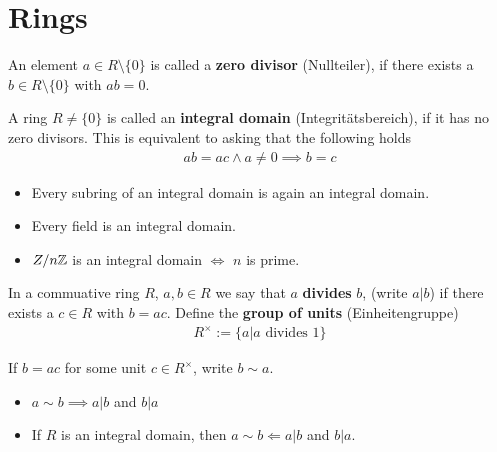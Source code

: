 \section{Rings}





\begin{dfn}
  An element $a \in R \setminus \{0\}$ is called a \textbf{zero divisor} (Nullteiler), if there exists a $b \in R \setminus \{0\}$ with $a b = 0$.

  A ring $R \neq \{0\}$ is called an \textbf{integral domain} (Integritätsbereich), if it has no zero divisors.
  This is equivalent to asking that the following holds
  \begin{align*}
    ab = ac \land a \neq 0 \implies b = c
  \end{align*}
\end{dfn}

\begin{prop}[]
  \phantom{a}
  \begin{itemize}
    \item Every subring of an integral domain is again an integral domain.
    \item Every field is an integral domain.
    \item $Z/n\mathbb{Z}$ is an integral domain $\iff$ $n$ is prime.
  \end{itemize}
\end{prop}

\begin{dfn}
  In a commuative ring $R$, $a,b \in R$ we say that $a$ \textbf{divides} $b$, (write $a | b$) if there exists a $c \in R$ with $b = ac$.
  Define the \textbf{group of units} (Einheitengruppe)
  \begin{align*}
    R^{\times} := \{a \big\vert a \text{ divides } 1\}
  \end{align*}

  If $b = ac$ for some unit $c \in R^{\times}$, write $b \sim a$.
\end{dfn}

\begin{prop}[]
  \phantom{a}
\begin{itemize}
  \item $a \sim b \implies a|b$ and $b|a$
  \item If $R$ is an integral domain, then $a \sim b \Leftarrow a | b$ and $b | a$.
\end{itemize}
\end{prop}

